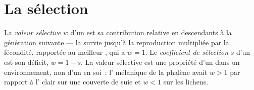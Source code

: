 \section{La sélection}

\begin{definition}\label{def:b2:population-genetics:fitness}
La \emph{valeur sélective} $w$ d'un  est sa contribution relative
en descendants à la génération suivante --- la survie jusqu'à la
reproduction multipliée par la fécondité, rapportée au meilleur ,
qui a $w = 1$. Le
\emph{coefficient de sélection} $s$ d'un  est son déficit,
$w = 1 - s$. La valeur sélective est une propriété d'un  dans un
environnement, non d'un  en soi~: l' mélanique de la phalène
avait $w > 1$ par rapport à l' clair sur une  couverte de
suie et $w < 1$ sur les lichens.
\end{definition}

